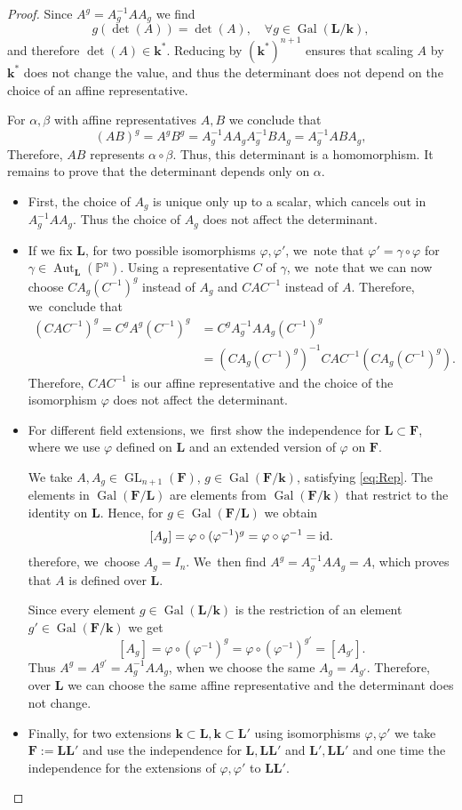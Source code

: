 \documentclass[JEP,XML,SOM,Unicode,NoFloatCountersInSection, NoEqCountersInSection,published]{cedram}
\newcommand{\id}{\textup{id}}
\DeclareMathOperator{\Gal}{Gal}
\theoremstyle{definition}
\newcommand{\kk}{{\boldsymbol{k}}}
\newcommand{\FF}{{\boldsymbol{F}}}
\newcommand{\LL}{{\boldsymbol{L}}}
\DeclareMathOperator{\GL}{GL}
\DeclareMathOperator{\Aut}{Aut}
\begin{document}
\begin{proof}
Since $A^g = A_g^{-1} A A_g$ we find
\[
g(\det(A)) = \det(A),\quad \forall g \in \Gal(\LL/\kk),
\]
and therefore $\det(A) \in \kk^*$. Reducing by $(\kk^*)^{n + 1}$ ensures that scaling $A$ by $\kk^*$ does not change the value, and thus the determinant does not depend on the choice of an affine representative.

For $\alpha, \beta$ with affine representatives $A,B$ we conclude that
\[
(AB)^g = A^g B^g = A_g^{-1}A A_g A_g^{-1} B A_g = A_g^{-1} AB A_g,
\]
Therefore, $AB$ represents $\alpha \circ \beta$. Thus, this determinant is a homomorphism. It remains to prove that the determinant depends only on $\alpha$.
\begin{itemize}
\item First, the choice of $A_g$ is unique only up to a scalar, which cancels out in $A_g^{-1} A A_g$. Thus the choice of $A_g$ does not affect the determinant.
\item If we fix $\LL$, for two possible isomorphisms $\varphi, \varphi'$, we~note that $\varphi' = \gamma \circ \varphi$ for $\gamma \in \Aut_{\LL}(\mathbb{P}^n)$. Using a representative $C$ of $\gamma$, we~note that we can now choose $C A_g (C^{-1})^g$ instead of $A_g$ and $CAC^{-1}$ instead of $A$. Therefore, we~conclude that
\begin{align*}
(CAC^{-1})^g = C^g A^g (C^{-1})^g&= C^g A_g^{-1} A A_g (C^{-1})^g
\\
&= (C A_g (C^{-1})^g)^{-1} CAC^{-1} (CA_g (C^{-1})^g).
\end{align*}
Therefore, $CAC^{-1}$ is our affine representative and the choice of the isomorphism $\varphi$ does not affect the determinant.
\item For different field extensions, we~first show the independence for $\LL \subset \FF$, where we use $\varphi$ defined on $\LL$ and an extended version of $\varphi$ on $\FF$.

We take $A, A_g \in \GL_{n + 1}(\FF)$, $g \in \Gal(\FF/\kk)$, satisfying \eqref{eq:Rep}. The elements in $\Gal(\FF/\LL)$ are elements from $\Gal(\FF/\kk)$ that restrict to the identity on $\LL$. Hence, for $g \in \Gal(\FF/\LL)$ we obtain
\[
[A_g] = \varphi \circ (\varphi^{-1})^g = \varphi \circ \varphi^{-1} = \id.
\]
therefore, we~choose $A_g = I_n$. We~then find $A^g = A_g^{-1} A A_g = A$, which proves that $A$ is defined over $\LL$.

Since every element $g \!\in\! \Gal(\LL/\kk)$ is the restriction of an element $g' \in \Gal(\FF/\kk)$ we get
\[
[A_g] = \varphi \circ (\varphi^{-1})^g = \varphi \circ (\varphi^{-1})^{g'} = [A_{g'}].
\]
Thus $A^g = A^{g'} = A_g^{-1} A A_g$, when we choose the same $A_g = A_{g'}$. Therefore, over $\LL$ we can choose the same affine representative and the determinant does not change.

\item Finally, for two extensions $\kk \subset \LL, \kk \subset \LL'$ using isomorphisms $\varphi, \varphi'$ we take $\FF:= \LL\LL'$ and use the independence for $\LL, \LL\LL'$ and $\LL', \LL\LL'$ and one time the independence for the extensions of $\varphi, \varphi'$ to $\LL\LL'$. \qedhere
\end{itemize}
\end{proof}
\end{document}
